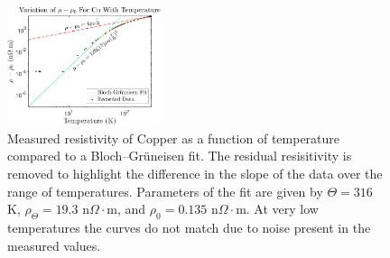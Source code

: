 \documentclass[prl,twocolumn,superscriptaddress,floatfix]{revtex4}
\begin{document}

\begin{figure}[ht]
    \begin{center}
    \includegraphics[width = 0.4\textwidth]{cu_final.pdf}
    \caption{Measured resistivity of Copper as a function of temperature compared to a Bloch–Gr\"uneisen fit. The residual resisitivity is removed to highlight the difference in the slope of the data over the range of temperatures. Parameters of the fit are given by $\Theta =316$ K, $\rho_{\Theta}=19.3$ n$\Omega \cdot$m, and $\rho_{0}=0.135$ n$\Omega \cdot$m. At very low temperatures the curves do not match due to noise present in the measured values.}
    \label{fig:resistivity_temp_cu}
    \end{center}
\end{figure}
\end{document}
